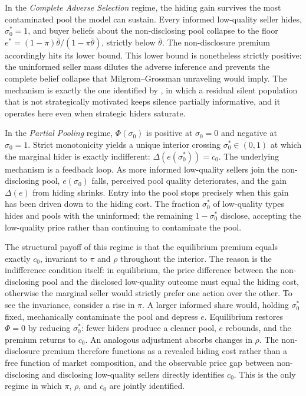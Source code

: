 \documentclass[10pt,letterpaper]{bp-template-concise}
\begin{document}
In the \emph{Complete Adverse Selection} regime, the hiding gain survives the most contaminated pool the model can sustain. Every informed low-quality seller hides, $\sigma_0^*=1$, and buyer beliefs about the non-disclosing pool collapse to the floor $e^*=(1-\pi)\bar{\theta}/(1-\pi\bar{\theta})$, strictly below $\bar{\theta}$. The non-disclosure premium accordingly hits its lower bound. This lower bound is nonetheless strictly positive: the uninformed seller mass dilutes the adverse inference and prevents the complete belief collapse that Milgrom--Grossman unraveling would imply. The mechanism is exactly the one identified by \citet{dye_disclosure_1985}, in which a residual silent population that is not strategically motivated keeps silence partially informative, and it operates here even when strategic hiders saturate.

In the \emph{Partial Pooling} regime, $\Phi(\sigma_0)$ is positive at $\sigma_0=0$ and negative at $\sigma_0=1$. Strict monotonicity yields a unique interior crossing $\sigma_0^*\in(0,1)$ at which the marginal hider is exactly indifferent: $\Delta(e(\sigma_0^*))=c_0$. The underlying mechanism is a feedback loop. As more informed low-quality sellers join the non-disclosing pool, $e(\sigma_0)$ falls, perceived pool quality deteriorates, and the gain $\Delta(e)$ from hiding shrinks. Entry into the pool stops precisely when this gain has been driven down to the hiding cost. The fraction $\sigma_0^*$ of low-quality types hides and pools with the uninformed; the remaining $1-\sigma_0^*$ disclose, accepting the low-quality price rather than continuing to contaminate the pool.

The structural payoff of this regime is that the equilibrium premium equals exactly $c_0$, invariant to $\pi$ and $\rho$ throughout the interior. The reason is the indifference condition itself: in equilibrium, the price difference between the non-disclosing pool and the disclosed low-quality outcome must equal the hiding cost, otherwise the marginal seller would strictly prefer one action over the other. To see the invariance, consider a rise in $\pi$. A larger informed share would, holding $\sigma_0^*$ fixed, mechanically contaminate the pool and depress $e$. Equilibrium restores $\Phi=0$ by reducing $\sigma_0^*$: fewer hiders produce a cleaner pool, $e$ rebounds, and the premium returns to $c_0$. An analogous adjustment absorbs changes in $\rho$. The non-disclosure premium therefore functions as a revealed hiding cost rather than a free function of market composition, and the observable price gap between non-disclosing and disclosing low-quality sellers directly identifies $c_0$. This is the only regime in which $\pi$, $\rho$, and $c_0$ are jointly identified.
\end{document}
